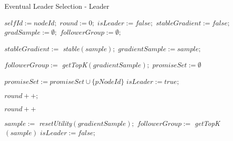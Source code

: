 \documentclass[a4paper, 11pt]{article}
\begin{document}
\begin{algorithm}[h]
\caption{Eventual Leader Selection - Leader} 
\label{leader}
\begin{algorithmic}[1]
  \State $selfId := nodeId;$ $round := 0;$
  \State $isLeader := false;$ $stableGradient := false;$
  \State $gradSample := \emptyset;$ $followerGroup := \emptyset;$
  \TriggerS[periodicCheck]{}\EndTriggerS
 \EndUpon

  \State $stableGradient := $ \emph{stable}$(sample);$
  \State $gradientSample := sample;$
 \EndUpon

\UponS[periodicCheck]{}
     \State $followerGroup := $ \emph{getTopK}$(gradientSample);$
        \EndTrigger
    \EndForEach
    \TriggerS[roundTimeout]{} \EndTriggerS
    \State $promiseSet := \emptyset$
  \EndIf
 \EndUponS

    \State $promiseSet := promiseSet \cup \{pNodeId\}$
        \EndTrigger 
      \EndForEach
      \State $isLeader := true;$
      \TriggerS[leaseTimeout]{}\EndTriggerS
      \TriggerS[cancelRoundTimeout]{}\EndTriggerS
    \EndIf
  \EndIf
\EndUpon

    \State $round++;$
    \TriggerS[cancelRoundTimeout]{}\EndTriggerS
  \EndIf
\EndUpon

\UponS[roundTimeout]{}
  \State $round++$
\EndUponS

\UponS[leaseTimeout]{} 
  \State $sample := $ \emph{resetUtility}$(gradientSample);$
    \State $followerGroup := $ \emph{getTopK}$(sample)$
       \EndTrigger
    \EndForEach
    \TriggerS[leaseTimeout]{}\EndTriggerS
  \Else
    \State $isLeader := false;$
  \EndIf
\EndUponS

\end{algorithmic}
\end{algorithm}
\end{document}
